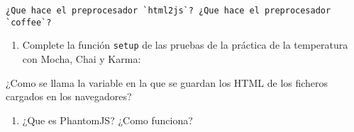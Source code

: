 \begin{verbatim}
¿Que hace el preprocesador `html2js`? ¿Que hace el preprocesador
`coffee`?
\end{verbatim}

\begin{enumerate}
\def\labelenumi{\arabic{enumi}.}
\setcounter{enumi}{6}
\itemsep1pt\parskip0pt
\item
  Complete la función \texttt{setup} de las pruebas de la práctica de la
  temperatura con Mocha, Chai y Karma:
\end{enumerate}

\begin{Shaded}
\begin{Highlighting}[]
\NormalTok{(}\NormalTok{()\{}
   \NormalTok{(} \NormalTok{________ !== }\NormalTok{) \{}
       \NormalTok{= ________[}\NormalTok{];}
      \FunctionTok{______________}\NormalTok{(}\NormalTok{);}
      \FunctionTok{______________}\NormalTok{(}\NormalTok{);}
  \NormalTok{\}}
\NormalTok{\});}
\end{Highlighting}
\end{Shaded}

¿Como se llama la variable en la que se guardan los HTML de los ficheros
cargados en los navegadores?

\begin{enumerate}
\def\labelenumi{\arabic{enumi}.}
\setcounter{enumi}{7}
\itemsep1pt\parskip0pt
\item
  ¿Que es PhantomJS? ¿Como funciona?
\end{enumerate}

